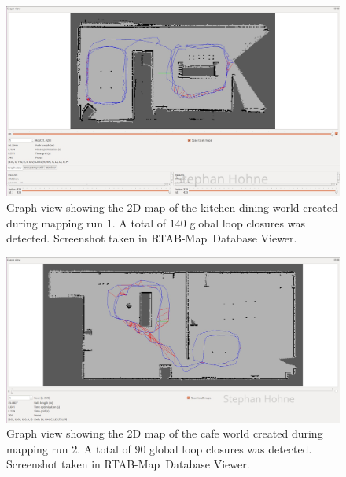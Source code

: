 \documentclass[10pt, journal, compsoc]{IEEEtran}
\newcommand{\rtab}{RTAB-Map}
\begin{document}
\begin{figure}[thpb]
      \centering
      \includegraphics[width=\textwidth]{images/graph_view_kitchen_dining.jpg}
      \caption{Graph view showing the 2D map of the kitchen dining world created during mapping run $1$. A total of $140$ global loop closures was detected. Screenshot taken in \rtab\ Database Viewer.}
      \label{fig:graph_view_kitchen_dining}
\end{figure}

\begin{figure}[thpb]
      \centering
      \includegraphics[width=\textwidth]{images/rtabmap_graph_view_cafe.jpg}
      \caption{Graph view showing the 2D map of the cafe world created during mapping run $2$. A total of $90$ global loop closures was detected. Screenshot taken in \rtab\ Database Viewer.}
      \label{fig:graph_view_cafe}
\end{figure}
\end{document}
